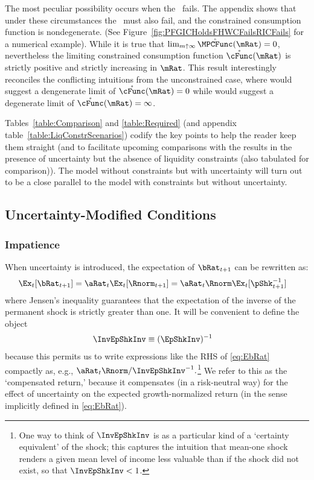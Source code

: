 \documentclass[./BufferStockTheory.tex]{subfiles}
\begin{document}
The most peculiar possibility occurs when the \RIC~fails.  The appendix shows that under these circumstances the \FHWC~must also fail, and the constrained consumption function is nondegenerate.  (See Figure~\ref{fig:PFGICHoldsFHWCFailsRICFails} for a numerical example).  While it is true that $\lim_{m \uparrow \infty}
\mathring{\MPCFunc}(\mRat) = 0$, nevertheless the limiting constrained
consumption function $\mathring{\cFunc}(\mRat)$ is strictly positive
and strictly increasing in $\mRat$.  This result interestingly
reconciles the conflicting intuitions from the unconstrained case,
where \cncl{\RIC} would suggest a dengenerate limit of
$\mathring{\cFunc}(\mRat)=0$ while \cncl{\FHWC} would suggest a
degenerate limit of $\mathring{\cFunc}(\mRat)=\infty$.

Tables~\ref{table:Comparison} and \ref{table:Required} (and appendix
table~\ref{table:LiqConstrScenarios}) codify the key points to help
the reader keep them straight (and to facilitate upcoming comparisons
with the results in the presence of uncertainty
but the absence of liquidity constraints (also tabulated for comparison)).  The model without constraints but with uncertainty will turn out to be a close parallel to the model with constraints but without uncertainty.

\hypertarget{Uncertainty-Modified-Conditions}{}
\subsection{Uncertainty-Modified Conditions}
\subsubsection{Impatience}





When uncertainty is introduced, the expectation of $\bRat_{t+1}$ can be rewritten as:  
\begin{align}
  \Ex_{t}[\bRat_{t+1}]  & =  \aRat_{t}\Ex_{t}[\Rnorm_{t+1}] = \aRat_{t}\Rnorm\Ex_{t}[\pShk_{t+1}^{-1}] \label{eq:EbRat}
\end{align}
where Jensen's inequality guarantees that the expectation of the inverse of the permanent
shock is strictly greater than one.  It will be convenient to define the object \hypertarget{InvEpShkInv}{}
\begin{align*}
  \InvEpShkInv  & \equiv  (\EpShkInv)^{-1}
\end{align*}
because this permits us to write expressions like the RHS of
\eqref{eq:EbRat} compactly as, e.g., $\aRat_{t}\Rnorm/
\InvEpShkInv^{-1}.$\footnote{One way to think of $\InvEpShkInv$ is as
  a particular kind of a `certainty equivalent' of the shock; this
  captures the intuition that mean-one shock renders a given mean
  level of income less valuable than if the shock did not exist, so
  that $\InvEpShkInv < 1$.}  We refer to this as the `compensated return,' because it compensates (in a risk-neutral way) for the effect of
uncertainty on the expected growth-normalized return (in the sense implicitly defined in
\eqref{eq:EbRat}).
\end{document}
